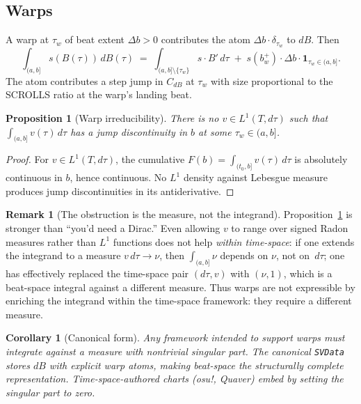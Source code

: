 \documentclass[11pt]{article}
\newtheorem{proposition}[theorem]{Proposition}
\newtheorem{corollary}[theorem]{Corollary}
\theoremstyle{definition}
\newtheorem{remark}[theorem]{Remark}
\newcommand{\dB}{\,dB}
\newcommand{\dtau}{\,d\tau}
\newcommand{\Lone}{L^{1}}
\newcommand{\one}{\mathbf{1}}
\begin{document}
\subsection{Warps}

A warp at $\tau_w$ of beat extent $\Delta b > 0$ contributes the atom
$\Delta b \cdot \delta_{\tau_w}$ to $dB$. Then
\[
\int_{(a, b]} s(B(\tau))\dB(\tau)
\;=\; \int_{(a,b] \setminus \{\tau_w\}} s \cdot B'\dtau
\;+\; s(b_w^+) \cdot \Delta b \cdot \one_{\tau_w \in (a, b]}.
\]
The atom contributes a step jump in $C_{dB}$ at $\tau_w$ with size proportional
to the SCROLLS ratio at the warp's landing beat.

\begin{proposition}[Warp irreducibility]
\label{prop:warp-irreducible}
There is no $v \in \Lone(T, d\tau)$ such that
$\int_{(a, b]} v(\tau)\dtau$ has a jump discontinuity in $b$ at some
$\tau_w \in (a, b]$.
\end{proposition}

\begin{proof}
For $v \in \Lone(T, d\tau)$, the cumulative
$F(b) = \int_{(t_0, b]} v(\tau)\dtau$ is absolutely continuous in $b$, hence
continuous. No $\Lone$ density against Lebesgue measure produces jump
discontinuities in its antiderivative. \qedhere
\end{proof}

\begin{remark}[The obstruction is the measure, not the integrand]
\label{rem:obstruction-is-measure}
Proposition~\ref{prop:warp-irreducible} is stronger than ``you'd need a
Dirac.'' Even allowing $v$ to range over signed Radon measures rather than
$\Lone$ functions does not help \emph{within time-space}: if one extends the
integrand to a measure $v\dtau \to \nu$, then $\int_{(a,b]} \nu$ depends on
$\nu$, not on $\dtau$; one has effectively replaced the time-space pair
$(d\tau, v)$ with $(\nu, 1)$, which is a beat-space integral against a
different measure. Thus warps are not expressible by enriching the integrand
within the time-space framework: they require a different measure.
\end{remark}

\begin{corollary}[Canonical form]
\label{cor:canonical}
Any framework intended to support warps must integrate against a measure with
nontrivial singular part. The canonical \texttt{SVData} stores $dB$
with explicit warp atoms, making beat-space the structurally complete
representation. Time-space-authored charts (osu!, Quaver) embed by setting the
singular part to zero.
\end{corollary}
\end{document}
